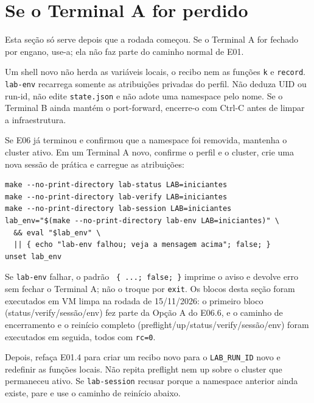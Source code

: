\documentclass[12pt,openany,oneside,a4paper,chapter=TITLE,english,brazil]{abntex2}
\begin{document}
\section*{Se o Terminal A for perdido}\label{se-o-terminal-a-for-perdido}

Esta seção só serve depois que a rodada começou. Se o Terminal A for fechado
por engano, use-a; ela não faz parte do caminho normal de E01.

Um shell novo não herda as variáveis locais, o recibo nem as funções \texttt{k} e
\texttt{record}. \texttt{lab-{}\allowbreak{}env} recarrega somente as atribuições privadas do perfil. Não
deduza UID ou run-id, não edite \texttt{state.\allowbreak{}json} e não adote uma namespace pelo
nome. Se o Terminal B ainda mantém o port-forward, encerre-o com Ctrl-C antes
de limpar a infraestrutura.

Se E06 já terminou e confirmou que a namespace foi removida, mantenha o cluster
ativo. Em um Terminal A novo, confirme o perfil e o cluster, crie uma nova
sessão de prática e carregue as atribuições:

\begin{verbatim}
make --no-print-directory lab-status LAB=iniciantes
make --no-print-directory lab-verify LAB=iniciantes
make --no-print-directory lab-session LAB=iniciantes
lab_env="$(make --no-print-directory lab-env LAB=iniciantes)" \
  && eval "$lab_env" \
  || { echo "lab-env falhou; veja a mensagem acima"; false; }
unset lab_env
\end{verbatim}

Se \texttt{lab-{}\allowbreak{}env} falhar, o padrão \texttt{\textbar{}\allowbreak{}\textbar{}\allowbreak{} \{ .\allowbreak{}.\allowbreak{}.\allowbreak{}; false; \}} imprime o aviso e devolve
erro sem fechar o Terminal A; não o troque por \texttt{exit}. Os blocos desta seção
foram executados em VM limpa na rodada de 15/11/2026: o primeiro bloco
(status/verify/sessão/env) fez parte da Opção A do E06.6, e o caminho de
encerramento e o reinício completo (preflight/up/status/verify/sessão/env)
foram executados em seguida, todos com \texttt{rc=\allowbreak{}0}.

Depois, refaça E01.4 para criar um recibo novo para o \texttt{LAB\_\allowbreak{}RUN\_\allowbreak{}ID} novo e
redefinir as funções locais. Não repita preflight nem up sobre o cluster que
permaneceu ativo. Se \texttt{lab-{}\allowbreak{}session} recusar porque a namespace anterior ainda
existe, pare e use o caminho de reinício abaixo.
\end{document}
